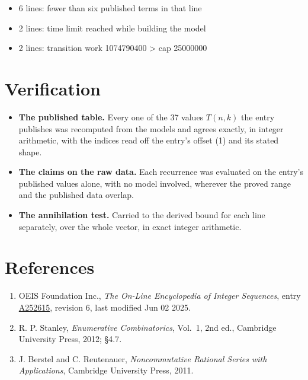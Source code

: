 \documentclass[11pt]{article}
\theoremstyle{definition}
\begin{document}
\begin{itemize}

\item 6 lines: fewer than six published terms in that line

\item 2 lines: time limit reached while building the model

\item 2 lines: transition work 1074790400 > cap 25000000

\end{itemize}

\section{Verification}

\begin{itemize}

\item {\bfseries The published table.} Every one of the 37 values $T(n,k)$ the entry publishes was recomputed from the models and agrees exactly, in integer arithmetic, with the indices read off the entry's offset (1) and its stated shape.

\item {\bfseries The claims on the raw data.} Each recurrence was evaluated on the entry's published values alone, with no model involved, wherever the proved range and the published data overlap.

\item {\bfseries The annihilation test.} Carried to the derived bound for each line separately, over the whole vector, in exact integer arithmetic.

\end{itemize}

\section{References}

\begin{enumerate}

\item OEIS Foundation Inc., \emph{The On-Line Encyclopedia of Integer Sequences}, entry \href{https://oeis.org/A252615}{A252615}, revision 6, last modified Jun 02 2025.

\item R. P. Stanley, \emph{Enumerative Combinatorics}, Vol.~1, 2nd ed., Cambridge University Press, 2012; \S4.7.

\item J. Berstel and C. Reutenauer, \emph{Noncommutative Rational Series with Applications}, Cambridge University Press, 2011.

\end{enumerate}
\end{document}
